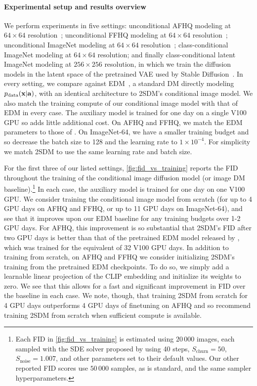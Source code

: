\paragraph{Experimental setup and results overview}
We perform experiments in five settings: unconditional AFHQ modeling at $64\times64$ resolution~\citep{choi2020stargan}; unconditional FFHQ modeling at $64\times64$ resolution~\citep{karras2018style}; unconditional ImageNet modeling at $64\times64$ resolution~\citep{deng2009imagenet}; class-conditional ImageNet modeling at $64\times64$ resolution; and finally class-conditional latent ImageNet modeling at $256\times256$ resolution, in which we train the diffusion models in the latent space of the pretrained VAE used by Stable Diffusion~\citep{rombach2022high}. In every setting, we compare against EDM~\citep{karras2022elucidating}, a standard DM directly modeling $p_{\rm{data}}({\mathbf{x}}|{\mathbf{a}})$, with an identical architecture to 2SDM's conditional image model. We also match the training compute of our conditional image model with that of EDM in every case. The auxiliary model is trained for one day on a single V100 GPU so adds little additional cost. On AFHQ and FFHQ, we match the EDM parameters to those of \citet{karras2022elucidating}. On ImageNet-64, we have a smaller training budget and so decrease the batch size to 128 and the learning rate to $1\times10^{-4}$. For simplicity we match 2SDM to use the same learning rate and batch size.

For the first three of our listed settings, \cref{fig:fid_vs_training} reports the FID throughout the training of the conditional image diffusion model (or image DM baseline).\footnote{Each FID in \cref{fig:fid_vs_training} is estimated using $20\,000$ images, each sampled with the SDE solver proposed by \citet{karras2022elucidating} using 40 steps, $S_\text{churn}=50$, $S_\text{noise}=1.007$, and other parameters set to their default values. Our other reported FID scores use $50\,000$ samples, as is standard, and the same sampler hyperparameters.}  In each case, the auxiliary model is trained for one day on one V100 GPU. We consider training the conditional image model from scratch (for up to 4 GPU days on AFHQ and FFHQ, or up to 11 GPU days on ImageNet-64), and see that it improves upon our EDM baseline for any training budgets over 1-2 GPU days. For AFHQ, this improvement is so substantial that 2SDM's FID after two GPU days is better than that of the pretrained EDM model released by \citet{karras2022elucidating}, which was trained for the equivalent of 32 V100 GPU days. In addition to training from scratch, on AFHQ and FFHQ we consider initializing 2SDM's training from the pretrained EDM checkpoints. To do so, we simply add a learnable linear projection of the CLIP embedding and initialize its weights to zero. We see that this allows for a fast and significant improvement in FID over the baseline in each case. We note, though, that training 2SDM from scratch for 4 GPU days outperforms 4 GPU days of finetuning on AFHQ and so recommend training 2SDM from scratch when sufficient compute is available.


